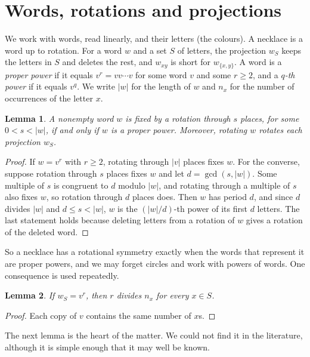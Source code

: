 \documentclass[11pt,a4paper]{article}
\newtheorem{lemma}{Lemma}
\theoremstyle{remark}
\begin{document}
\section{Words, rotations and projections}

We work with words, read linearly, and their letters (the colours). A
necklace is a word up to rotation. For a word $w$ and a set $S$ of
letters, the projection $w_S$ keeps the letters in $S$ and deletes the
rest, and $w_{xy}$ is short for $w_{\{x,y\}}$. A word is a \emph{proper
power} if it equals $v^r=vv\cdots v$ for some word $v$ and some $r\ge2$,
and a \emph{$q$-th power} if it equals $v^q$. We write $|w|$ for the
length of $w$ and $n_x$ for the number of occurrences of the letter $x$.

\begin{lemma}\label{lem:rotation}
A nonempty word $w$ is fixed by a rotation through $s$ places, for some
$0<s<|w|$, if and only if $w$ is a proper power. Moreover, rotating $w$
rotates each projection $w_S$.
\end{lemma}

\begin{proof}
If $w=v^r$ with $r\ge2$, rotating through $|v|$ places fixes $w$. For the
converse, suppose rotation through $s$ places fixes $w$ and let
$d=\gcd(s,|w|)$. Some multiple of $s$ is congruent to $d$ modulo $|w|$,
and rotating through a multiple of $s$ also fixes $w$, so rotation
through $d$ places does. Then $w$ has period $d$, and since $d$ divides
$|w|$ and $d\le s<|w|$, $w$ is the $(|w|/d)$-th power of its first $d$
letters. The last statement holds because deleting letters from a
rotation of $w$ gives a rotation of the deleted word.
\end{proof}

So a necklace has a rotational symmetry exactly when the words that
represent it are proper powers, and we may forget circles and work with
powers of words. One consequence is used repeatedly.

\begin{lemma}\label{lem:divide}
If $w_S=v^r$, then $r$ divides $n_x$ for every $x\in S$.
\end{lemma}

\begin{proof}
Each copy of $v$ contains the same number of $x$s.
\end{proof}

The next lemma is the heart of the matter. We could not find it in the
literature, although it is simple enough that it may well be known.
\end{document}
